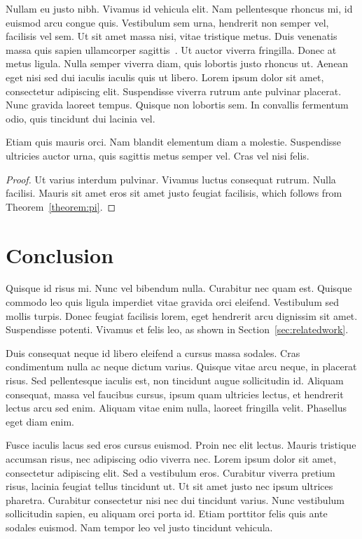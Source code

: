 \documentclass[submission]{gmp2015}
\begin{document}
\noindent
Nullam eu justo nibh. Vivamus id vehicula elit. Nam pellentesque rhoncus mi, id euismod arcu congue quis. Vestibulum sem urna, hendrerit non semper vel, facilisis vel sem. Ut sit amet massa nisi, vitae tristique metus. Duis venenatis massa quis sapien ullamcorper sagittis~\cite{Li:2010:PSO}. Ut auctor viverra fringilla. Donec at metus ligula. Nulla semper viverra diam, quis lobortis justo rhoncus ut. Aenean eget nisi sed dui iaculis iaculis quis ut libero. Lorem ipsum dolor sit amet, consectetur adipiscing elit. Suspendisse viverra rutrum ante pulvinar placerat. Nunc gravida laoreet tempus. Quisque non lobortis sem. In convallis fermentum odio, quis tincidunt dui lacinia vel.

\begin{corollary}
Etiam quis mauris orci. Nam blandit elementum diam a molestie. Suspendisse ultricies auctor urna, quis sagittis metus semper vel. Cras vel nisi felis.
\end{corollary}

\begin{proof}
Ut varius interdum pulvinar. Vivamus luctus consequat rutrum. Nulla facilisi. Mauris sit amet eros sit amet justo feugiat facilisis, which follows from Theorem~\ref{theorem:pi}.
\end{proof}


\section{Conclusion}

Quisque id risus mi. Nunc vel bibendum nulla. Curabitur nec quam est. Quisque commodo leo quis ligula imperdiet vitae gravida orci eleifend. Vestibulum sed mollis turpis. Donec feugiat facilisis lorem, eget hendrerit arcu dignissim sit amet. Suspendisse potenti. Vivamus et felis leo, as shown in Section~\ref{sec:relatedwork}.

Duis consequat neque id libero eleifend a cursus massa sodales. Cras condimentum nulla ac neque dictum varius. Quisque vitae arcu neque, in placerat risus. Sed pellentesque iaculis est, non tincidunt augue sollicitudin id. Aliquam consequat, massa vel faucibus cursus, ipsum quam ultricies lectus, et hendrerit lectus arcu sed enim. Aliquam vitae enim nulla, laoreet fringilla velit. Phasellus eget diam enim.

Fusce iaculis lacus sed eros cursus euismod. Proin nec elit lectus. Mauris tristique accumsan risus, nec adipiscing odio viverra nec. Lorem ipsum dolor sit amet, consectetur adipiscing elit. Sed a vestibulum eros. Curabitur viverra pretium risus, lacinia feugiat tellus tincidunt ut. Ut sit amet justo nec ipsum ultrices pharetra. Curabitur consectetur nisi nec dui tincidunt varius. Nunc vestibulum sollicitudin sapien, eu aliquam orci porta id. Etiam porttitor felis quis ante sodales euismod. Nam tempor leo vel justo tincidunt vehicula.
\end{document}
